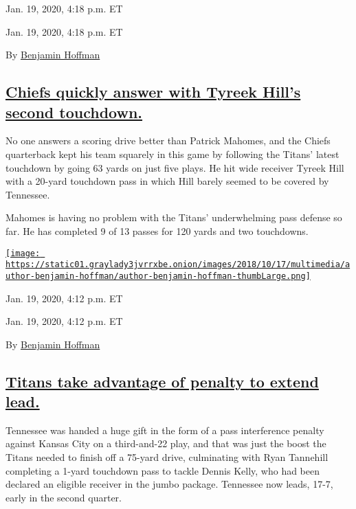 Jan. 19, 2020, 4:18 p.m. ET

Jan. 19, 2020, 4:18 p.m. ET

By
\href{https://www.nytimes3xbfgragh.onion/by/benjamin-hoffman}{Benjamin
Hoffman}

\hypertarget{chiefs-quickly-answer-with-tyreek-hills-second-touchdown}{%
\subsection{\texorpdfstring{\protect\hyperlink{chiefs-quickly-answer-with-tyreek-hills-second-touchdown}{Chiefs
quickly answer with Tyreek Hill's second
touchdown.}}{Chiefs quickly answer with Tyreek Hill's second touchdown.}}\label{chiefs-quickly-answer-with-tyreek-hills-second-touchdown}}

No one answers a scoring drive better than Patrick Mahomes, and the
Chiefs quarterback kept his team squarely in this game by following the
Titans' latest touchdown by going 63 yards on just five plays. He hit
wide receiver Tyreek Hill with a 20-yard touchdown pass in which Hill
barely seemed to be covered by Tennessee.

Mahomes is having no problem with the Titans' underwhelming pass defense
so far. He has completed 9 of 13 passes for 120 yards and two
touchdowns.

\href{https://www.nytimes3xbfgragh.onion/by/benjamin-hoffman}{\texttt{[image: https://static01.graylady3jvrrxbe.onion/images/2018/10/17/multimedia/author-benjamin-hoffman/author-benjamin-hoffman-thumbLarge.png]}}

Jan. 19, 2020, 4:12 p.m. ET

Jan. 19, 2020, 4:12 p.m. ET

By
\href{https://www.nytimes3xbfgragh.onion/by/benjamin-hoffman}{Benjamin
Hoffman}

\hypertarget{titans-take-advantage-of-penalty-to-extend-lead}{%
\subsection{\texorpdfstring{\protect\hyperlink{titans-take-advantage-of-penalty-to-extend-lead}{Titans
take advantage of penalty to extend
lead.}}{Titans take advantage of penalty to extend lead.}}\label{titans-take-advantage-of-penalty-to-extend-lead}}

Tennessee was handed a huge gift in the form of a pass interference
penalty against Kansas City on a third-and-22 play, and that was just
the boost the Titans needed to finish off a 75-yard drive, culminating
with Ryan Tannehill completing a 1-yard touchdown pass to tackle Dennis
Kelly, who had been declared an eligible receiver in the jumbo package.
Tennessee now leads, 17-7, early in the second quarter.

